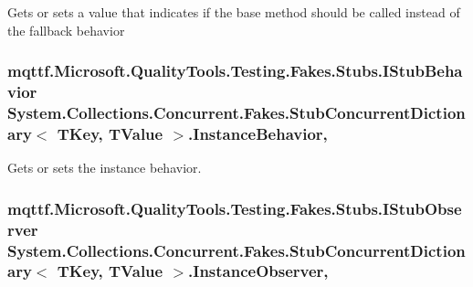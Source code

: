 Gets or sets a value that indicates if the base method should be called instead of the fallback behavior

\hypertarget{class_system_1_1_collections_1_1_concurrent_1_1_fakes_1_1_stub_concurrent_dictionary_3_01_t_key_00_01_t_value_01_4_a5e576a7ce80dcd46675fc7ad7325bed7}{
\subsubsection[{Instance\-Behavior}]{\setlength{\rightskip}{0pt plus 5cm}mqttf.\-Microsoft.\-Quality\-Tools.\-Testing.\-Fakes.\-Stubs.\-I\-Stub\-Behavior System.\-Collections.\-Concurrent.\-Fakes.\-Stub\-Concurrent\-Dictionary$<$ T\-Key, T\-Value $>$.Instance\-Behavior\hspace{0.3cm}{\ttfamily [get]}, {\ttfamily [set]}}}\label{class_system_1_1_collections_1_1_concurrent_1_1_fakes_1_1_stub_concurrent_dictionary_3_01_t_key_00_01_t_value_01_4_a5e576a7ce80dcd46675fc7ad7325bed7}


Gets or sets the instance behavior.

\hypertarget{class_system_1_1_collections_1_1_concurrent_1_1_fakes_1_1_stub_concurrent_dictionary_3_01_t_key_00_01_t_value_01_4_a032e3faad1e8c77e623adca9fc867e67}{
\subsubsection[{Instance\-Observer}]{\setlength{\rightskip}{0pt plus 5cm}mqttf.\-Microsoft.\-Quality\-Tools.\-Testing.\-Fakes.\-Stubs.\-I\-Stub\-Observer System.\-Collections.\-Concurrent.\-Fakes.\-Stub\-Concurrent\-Dictionary$<$ T\-Key, T\-Value $>$.Instance\-Observer\hspace{0.3cm}{\ttfamily [get]}, {\ttfamily [set]}}}\label{class_system_1_1_collections_1_1_concurrent_1_1_fakes_1_1_stub_concurrent_dictionary_3_01_t_key_00_01_t_value_01_4_a032e3faad1e8c77e623adca9fc867e67}


